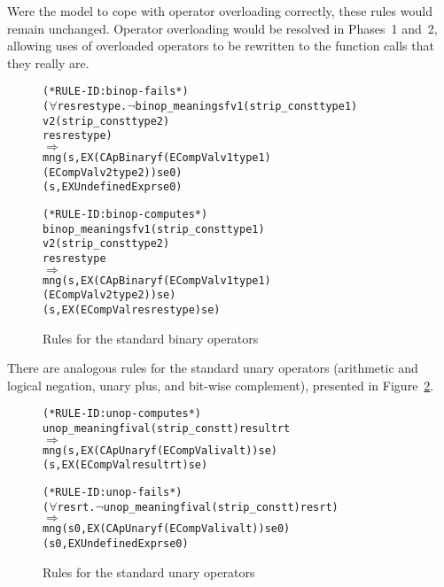 \documentclass[11pt]{article}
\begin{document}
Were the model to cope with operator overloading correctly, these
rules would remain unchanged.  Operator overloading would be resolved
in Phases~1 and~2, allowing uses of overloaded operators to be
rewritten to the function calls that they really are.
\begin{figure}[htbp]
%
%
%
\begin{alltt}
(* RULE-ID: binop-fails *)
     (\(\forall\)res restype. \(\neg\)binop_meaning s f \(\!\)v1 (strip_const type1)
                                       v2 (strip_const type2)
                                       res restype)
   \(\Rightarrow\)
     mng (s, EX (CApBinary f (ECompVal v1 type1)
                             (ECompVal v2 type2)) se0)
         (s, EX UndefinedExpr se0)
\end{alltt}

\begin{alltt}
(* RULE-ID: binop-computes *)
     binop_meaning s f v1 (strip_const type1)
                       v2 (strip_const type2)
                       res restype
   \(\Rightarrow\)
     mng (s, EX (CApBinary f (ECompVal v1 type1)
                             (ECompVal v2 type2)) se)
         (s, EX (ECompVal res restype) se)
\end{alltt}
\caption{Rules for the standard binary operators}
\label{fig:capbinary-rules}
\end{figure}

There are analogous rules for the standard unary operators (arithmetic
and logical negation, unary plus, and bit-wise complement), presented
in Figure~\ref{fig:capunary-rules}.
\begin{figure}[htbp]
%
%
%
\begin{alltt}
(* RULE-ID: unop-computes *)
     unop_meaning f ival (strip_const t) result rt
   \(\Rightarrow\)
     mng (s, EX (CApUnary f (ECompVal ival t)) se)
         (s, EX (ECompVal result rt) se)
\end{alltt}

\begin{alltt}
(* RULE-ID: unop-fails *)
     (\(\forall\)res rt. \(\neg\)unop_meaning f ival (strip_const t) res rt)
   \(\Rightarrow\)
     mng (s0, EX (CApUnary f (ECompVal ival t)) se0)
         (s0, EX UndefinedExpr se0)
\end{alltt}
\caption{Rules for the standard unary operators}
\label{fig:capunary-rules}
\end{figure}
\end{document}
